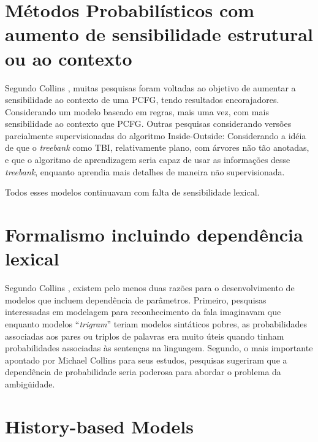 \section{Métodos Probabilísticos com aumento de sensibilidade estrutural ou ao contexto}
\label{sec:aumento_sensibilidade}

Segundo Collins \cite{collins99}, muitas pesquisas foram voltadas ao objetivo de aumentar a sensibilidade ao contexto de uma PCFG, tendo resultados encorajadores.
Considerando um modelo baseado em regras, mais uma vez, com mais sensibilidade ao contexto que PCFG. Outras pesquisas considerando versões parcialmente supervisionadas do algoritmo Inside-Outside:
Considerando a idéia de que o \emph{treebank} como TBI, relativamente plano, com árvores não tão anotadas, e que o algoritmo de aprendizagem seria capaz de usar as informações desse \emph{treebank}, enquanto aprendia mais detalhes de maneira não supervisionada.

Todos esses modelos continuavam com falta de sensibilidade lexical.


\section{Formalismo incluindo dependência lexical}
\label{sec:dependencia_lexical}

Segundo Collins \cite{collins99}, existem pelo menos duas razões para o desenvolvimento de modelos que incluem dependência de parâmetros. Primeiro, pesquisas interessadas em modelagem para reconhecimento da fala imaginavam que enquanto modelos ``\emph{trigram}'' teriam modelos sintáticos pobres, as probabilidades associadas aos pares ou triplos de palavras era muito úteis quando tinham probabilidades associadas às sentenças na linguagem.
Segundo, o mais importante apontado por Michael Collins para seus estudos, pesquisas sugeriram que a dependência de probabilidade seria poderosa para abordar o problema da ambigüidade.


\section{History-based Models}
\label{sec:hbm}


